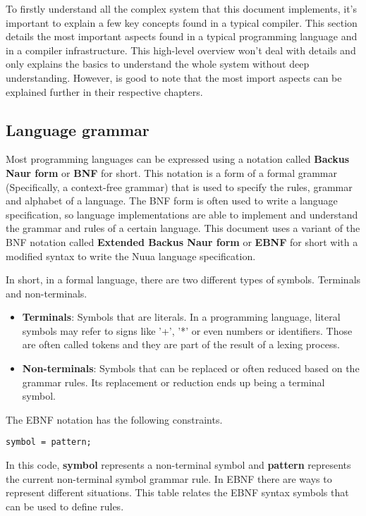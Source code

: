 To firstly understand all the complex system that this document implements, it's important to explain a few key concepts
found in a typical compiler. This section details the most important aspects found in a typical programming language and in a compiler infrastructure.
This high-level overview won't deal with details and only explains the basics to understand the whole system without deep understanding.
However, is good to note that the most import aspects can be explained further in their respective chapters.


\subsection{Language grammar}

Most programming languages can be expressed using a notation called \textbf{Backus Naur form} or \textbf{BNF} for short. This notation is a form of a formal
grammar (Specifically, a context-free grammar) that is used to specify the rules, grammar and alphabet of a language. The BNF form is often used to write
a language specification, so language implementations are able to implement and understand the grammar and rules of a certain language. This
document uses a variant of the BNF notation called \textbf{Extended Backus Naur form} or \textbf{EBNF} for short with a modified syntax to
write the Nuua language specification.

In short, in a formal language, there are two different types of symbols. Terminals and non-terminals.

\begin{itemize}
    \item \textbf{Terminals}: Symbols that are literals. In a programming language, literal symbols may refer to signs like '+', '*'
        or even numbers or identifiers. Those are often called tokens and they are part of the result of a lexing process.
    \item \textbf{Non-terminals}: Symbols that can be replaced or often reduced based on the grammar rules. Its replacement or reduction
        ends up being a terminal symbol.
\end{itemize}

The EBNF notation has the following constraints.

\begin{center}
    \texttt{symbol = pattern;}
\end{center}

In this code, \textbf{symbol} represents a non-terminal symbol and \textbf{pattern} represents the current non-terminal symbol grammar rule.
In EBNF there are ways to represent different situations. This table relates the EBNF syntax symbols that can be used to define rules.

